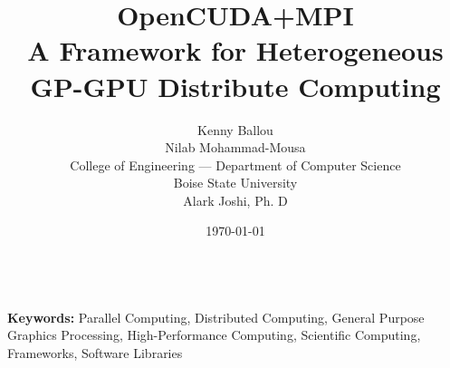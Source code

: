 \documentclass[a4paper,11pt]{article}
\title{OpenCUDA+MPI\\
       A Framework for Heterogeneous GP-GPU Distribute Computing}
\date{\today}
\author{Kenny Ballou\\
        Nilab Mohammad-Mousa\\
        College of Engineering --- Department of Computer Science\\
        Boise State University\\
        Alark Joshi, Ph. D}
\begin{document}


\nocite{*}
\thispagestyle{fancy}
\\
\textbf{Keywords:} Parallel Computing, Distributed Computing, General Purpose
Graphics Processing, High-Performance Computing, Scientific Computing,
Frameworks, Software Libraries






\appendix
%


\printglossaries{}
\end{document}
